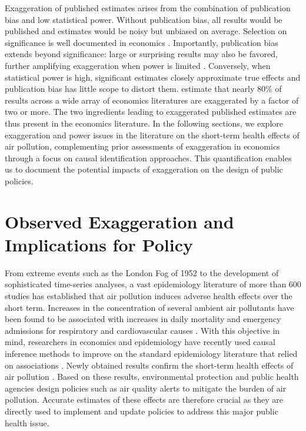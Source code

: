 \documentclass[12pt]{article}
\begin{document}
		Exaggeration of published estimates arises from the combination of publication bias and low statistical power. Without publication bias, all results would be published and estimates would be noisy but unbiased on average. Selection on significance is well documented in economics \citep{rosenthal_file_1979, brodeur_star_2016, andrews_identification_2019, vivalt_specification_2019, abadie_statistical_2020, brodeur_methods_2020}. Importantly, publication bias extends beyond significance: large or surprising results may also be favored, further amplifying exaggeration when power is limited \citep{andrews_inference_2024}. Conversely, when statistical power is high, significant estimates closely approximate true effects and publication bias has little scope to distort them. \citet{ioannidis_power_2017} estimate that nearly 80\% of results across a wide array of economics literatures are exaggerated by a factor of two or more. The two ingredients leading to exaggerated published estimates are thus present in the economics literature. In the following sections, we explore exaggeration and power issues in the literature on the short-term health effects of air pollution, complementing prior assessments of exaggeration in economics through a focus on causal identification approaches. This quantification enables us to document the potential impacts of exaggeration on the design of public policies.
			



\section{Observed Exaggeration and Implications for Policy}\label{section_lit_policy}

	From extreme events such as the London Fog of 1952 to the development of sophisticated time-series analyses, a vast epidemiology literature of more than 600 studies has established that air pollution induces adverse health effects over the short term. Increases in the concentration of several ambient air pollutants have been found to be associated with increases in daily mortality and emergency admissions for respiratory and cardiovascular causes \citep{schwartz_what_1994, samet_national_2000, letertre_shortterm_2002, bell_time-series_2004, liu_ambient_2019}. With this objective in mind, researchers in economics and epidemiology have recently used causal inference methods to improve on the standard epidemiology literature that relied on associations \citep{dominici_best_2017, bind_causal_2019}. Newly obtained results confirm the short-term health effects of air pollution \citep{schwartz_estimating_2015, schwartz_national_2018, deryugina_mortality_2019}. Based on these results, environmental protection and public health agencies design policies such as air quality alerts to mitigate the burden of air pollution. Accurate estimates of these effects are therefore crucial as they are directly used to implement and update policies to address this major public health issue.
	
\end{document}
